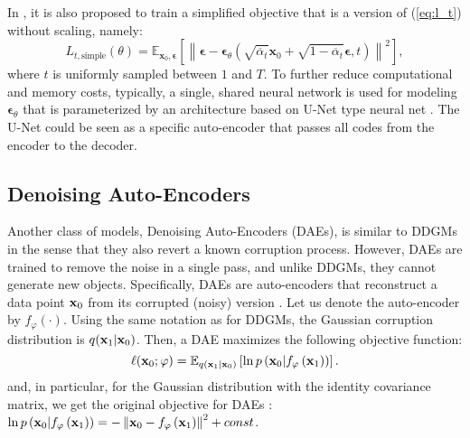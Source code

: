 In \cite{ho2020denoising}, it is also proposed to train a simplified objective that is a version of (\ref{eq:l_t}) without scaling, namely:
\begin{equation}\label{eq:l_t_simple}
    L_{t,\text {simple}}(\theta) = \mathbb{E}_{\mathbf{x}_{0}, \boldsymbol{\epsilon}}\left[\left\|\boldsymbol{\epsilon}-\boldsymbol{\epsilon}_{\theta}\left(\sqrt{\overline{\alpha}_{t}} \mathbf{x}_{0}+\sqrt{1-\overline{\alpha}_{t}} \boldsymbol{\epsilon}, t\right)\right\|^{2}\right] ,
\end{equation}
where $t$ is uniformly sampled between $1$ and $T$. To further reduce computational and memory costs, typically, a single, shared neural network is used for modeling $\boldsymbol{\epsilon}_{\theta}$ \cite{ho2020denoising, kingma2021variational, nichol2021improved} that is parameterized by an architecture based on U-Net type neural net \cite{ronneberger2015u}. The U-Net could be seen as a specific auto-encoder that passes all codes from the encoder to the decoder.

\subsection{Denoising Auto-Encoders}
Another class of models, Denoising Auto-Encoders (DAEs), is similar to DDGMs in the sense that they also revert a known corruption process. However, DAEs are trained to remove the noise in a single pass, and unlike DDGMs, they cannot generate new objects. Specifically, DAEs are auto-encoders that reconstruct a data point ${\mathbf{x}}_0$ from its corrupted (noisy) version \cite{alain2014regularized, bengio2013generalized, chen2014marginalized, vincent2008extracting}. Let us denote the auto-encoder by $f_{\varphi}(\cdot)$. Using the same notation as for DDGMs, the Gaussian corruption distribution is $q({\mathbf{x}}_1 | {\mathbf{x}}_0)$. Then, a DAE maximizes the following objective function:
\begin{equation}
    \ell({\mathbf{x}}_0;\varphi) = \mathbb{E}_{q({\mathbf{x}}_1 | {\mathbf{x}}_0)}\left[\ln p\left({\mathbf{x}}_0 | f_{\varphi}\left({\mathbf{x}}_1\right)\right)\right] .
\end{equation}
and, in particular, for the Gaussian distribution with the identity covariance matrix, we get the original objective for DAEs \cite{vincent2008extracting}: $\ln p\left({\mathbf{x}}_0 | f_{\varphi}\left({\mathbf{x}}_1\right)\right) = -\left\| {\mathbf{x}}_0 - f_{\varphi}\left({\mathbf{x}}_1\right) \right\|^2 + const$.
